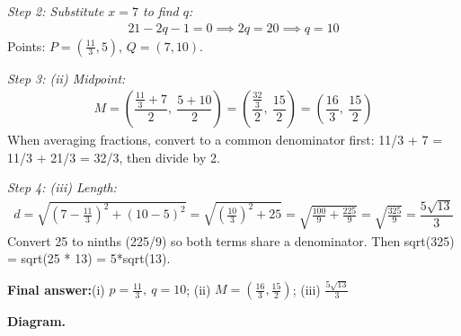 \documentclass[11pt]{article}
\begin{document}
\textit{Step 2: Substitute \( x = 7 \) to find \( q \):}
\[\begin{gathered}
21 - 2q - 1 = 0 \implies 2q = 20 \implies q = 10
\end{gathered}\]
Points: \( P = \left(\frac{11}{3}, 5\right) \), \( Q = (7, 10) \).

\textit{Step 3: (ii) Midpoint:}
\[\begin{gathered}
M = \left(\dfrac{\frac{11}{3} + 7}{2},\ \dfrac{5 + 10}{2}\right) = \left(\dfrac{\frac{32}{3}}{2},\ \dfrac{15}{2}\right) = \left(\dfrac{16}{3},\ \dfrac{15}{2}\right)
\end{gathered}\]
When averaging fractions, convert to a common denominator first: 11/3 + 7 = 11/3 + 21/3 = 32/3, then divide by 2.

\textit{Step 4: (iii) Length:}
\[\begin{gathered}
d = \sqrt{\left(7 - \tfrac{11}{3}\right)^2 + (10 - 5)^2} = \sqrt{\left(\tfrac{10}{3}\right)^2 + 25} = \sqrt{\tfrac{100}{9} + \tfrac{225}{9}} = \sqrt{\tfrac{325}{9}} = \dfrac{5\sqrt{13}}{3}
\end{gathered}\]
Convert 25 to ninths (225/9) so both terms share a denominator. Then sqrt(325) = sqrt(25 * 13) = 5*sqrt(13).

\begin{answerbox}
\textbf{Final answer:}\quad (i) \(\displaystyle p = \frac{11}{3},\ q = 10\); (ii) \(\displaystyle M = \left(\frac{16}{3}, \frac{15}{2}\right)\); (iii) \(\displaystyle \frac{5\sqrt{13}}{3}\)
\end{answerbox}
\textbf{Diagram.}
\end{document}
